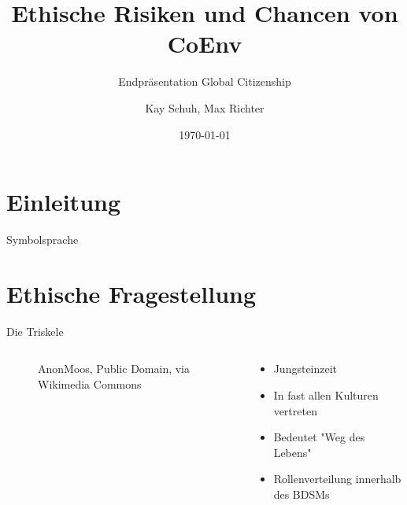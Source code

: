 \documentclass{cubeamer}
\title{Ethische Risiken und Chancen von CoEnv}
\subtitle{Endpräsentation Global Citizenship}
\author[Kay Schuh, Max Richter]{Kay Schuh, Max Richter}
\date{\today} %
\institute[Technische Hochschule Köln]{Code \& Context}
\begin{document}
\maketitle


\section{Einleitung}

\begin{frame}{Symbolsprache}
    \begin{center}
    
    \end{center}
\end{frame}

\section{Ethische Fragestellung}
\begin{frame}{Die Triskele}
    \begin{columns}
        \begin{column}{0.6\textwidth}
            \begin{figure}
                \centering
                
                \caption{\tiny AnonMoos, Public Domain, via Wikimedia Commons}
            \end{figure}
        \end{column}
        \begin{column}{0.4\textwidth}
            \begin{itemize}
                \item Jungsteinzeit
                \item In fast allen Kulturen vertreten
                \item Bedeutet "Weg des Lebens"
                \item Rollenverteilung innerhalb des BDSMs
            \end{itemize}
        \end{column}
    \end{columns}
\end{frame}
\end{document}
